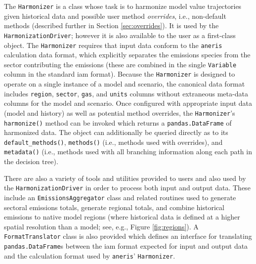 \documentclass[review]{elsarticle}
\newcommand{\code}[1]{\lstinline[basicstyle=\ttfamily\color{black}]|#1|}
\begin{document}
The \texttt{Harmonizer} is a class whose task is to harmonize model value
trajectories given historical data and possible user method \textit{overrides},
i.e., non-default methods (described further in Section \ref{sec:overrides}). It
is used by the \texttt{HarmonizationDriver}; however it is also available to the
user as a first-class object. The \texttt{Harmonizer} requires that input data
conform to the \code{aneris} calculation data format, which explicitly separates
the emissions species from the sector contributing the emissions (these are
combined in the single \code{Variable} column in the standard \gls{iam}
format). Because the \texttt{Harmonizer} is designed to operate on a single
instance of a model and scenario, the canonical data format includes
\texttt{region}, \texttt{sector}, \texttt{gas}, and \texttt{units} columns
without extraneous meta-data columns for the model and scenario. Once configured
with appropriate input data (model and history) as well as potential method
overrides, the \texttt{Harmonizer}'s \texttt{harmonize()} method can be invoked
which returns a \texttt{pandas.DataFrame} of harmonized data. The object can
additionally be queried directly as to its \texttt{default\_methods()},
\texttt{methods()} (i.e., methods used with overrides), and \texttt{metadata()}
(i.e., methods used with all branching information along each path in the
decision tree).

There are also a variety of tools and utilities provided to users and also used
by the \texttt{HarmonizationDriver} in order to process both input and output
data. These include an \texttt{EmissionsAggregator} class and related routines
used to generate sectoral emissions totals, generate regional totals, and
combine historical emissions to native model regions (where historical data is
defined at a higher spatial resolution than a model; see, e.g., Figure
\ref{fig:regions}). A \texttt{FormatTranslator} class is also provided which
defines an interface for translating \texttt{pandas.DataFrame}s between the \gls{iam}
format expected for input and output data and the calculation format used by
\code{aneris}' \texttt{Harmonizer}.
\end{document}
